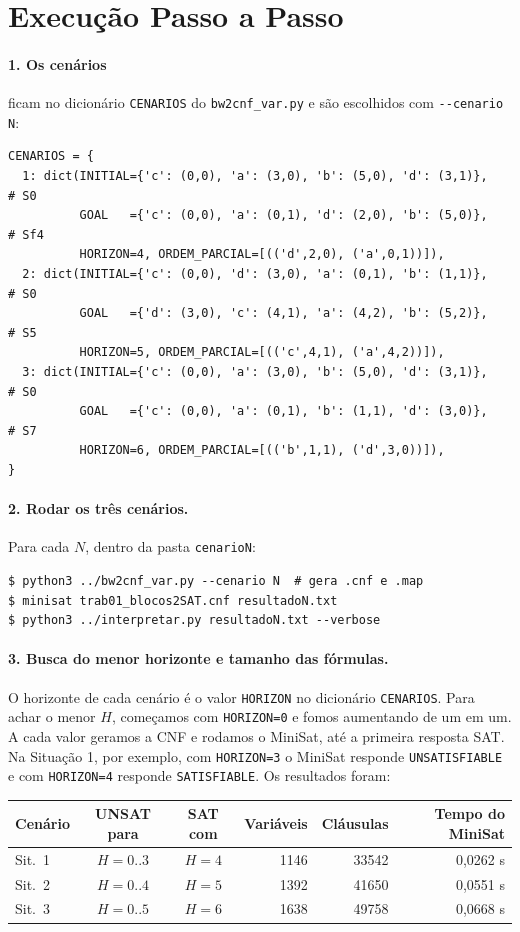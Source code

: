 \documentclass[11pt,a4paper]{article}
\begin{document}
\section{Execução Passo a Passo}
\label{sec:exec}
\paragraph{1. Os cenários} ficam no dicionário \texttt{CENARIOS} do
\texttt{bw2cnf\_var.py} e são escolhidos com \texttt{-{}-cenario N}:
\begin{lstlisting}
CENARIOS = {
  1: dict(INITIAL={'c': (0,0), 'a': (3,0), 'b': (5,0), 'd': (3,1)},   # S0
          GOAL   ={'c': (0,0), 'a': (0,1), 'd': (2,0), 'b': (5,0)},   # Sf4
          HORIZON=4, ORDEM_PARCIAL=[(('d',2,0), ('a',0,1))]),
  2: dict(INITIAL={'c': (0,0), 'd': (3,0), 'a': (0,1), 'b': (1,1)},   # S0
          GOAL   ={'d': (3,0), 'c': (4,1), 'a': (4,2), 'b': (5,2)},   # S5
          HORIZON=5, ORDEM_PARCIAL=[(('c',4,1), ('a',4,2))]),
  3: dict(INITIAL={'c': (0,0), 'a': (3,0), 'b': (5,0), 'd': (3,1)},   # S0
          GOAL   ={'c': (0,0), 'a': (0,1), 'b': (1,1), 'd': (3,0)},   # S7
          HORIZON=6, ORDEM_PARCIAL=[(('b',1,1), ('d',3,0))]),
}
\end{lstlisting}

\paragraph{2. Rodar os três cenários.} Para cada $N$, dentro da pasta \texttt{cenarioN}:
\begin{lstlisting}
$ python3 ../bw2cnf_var.py --cenario N  # gera .cnf e .map
$ minisat trab01_blocos2SAT.cnf resultadoN.txt
$ python3 ../interpretar.py resultadoN.txt --verbose
\end{lstlisting}

\paragraph{3. Busca do menor horizonte e tamanho das fórmulas.} O horizonte de cada
cenário é o valor \texttt{HORIZON} no dicionário \texttt{CENARIOS}. Para achar o
menor $H$, começamos com \texttt{HORIZON=0} e fomos aumentando de um em um. A cada
valor geramos a CNF e rodamos o MiniSat, até a primeira resposta SAT. Na Situação 1,
por exemplo, com \texttt{HORIZON=3} o MiniSat responde \texttt{UNSATISFIABLE} e com
\texttt{HORIZON=4} responde \texttt{SATISFIABLE}. Os resultados foram:
\begin{center}\small
\begin{tabular}{@{}lccrrr@{}}
\toprule
Cenário & UNSAT para & SAT com & Variáveis & Cláusulas & Tempo do MiniSat\\
\midrule
Sit.~1 & $H=0..3$ & $H=4$ & 1146 & 33542 & 0{,}0262 s\\
Sit.~2 & $H=0..4$ & $H=5$ & 1392 & 41650 & 0{,}0551 s\\
Sit.~3 & $H=0..5$ & $H=6$ & 1638 & 49758 & 0{,}0668 s\\
\bottomrule
\end{tabular}
\end{center}
\end{document}
